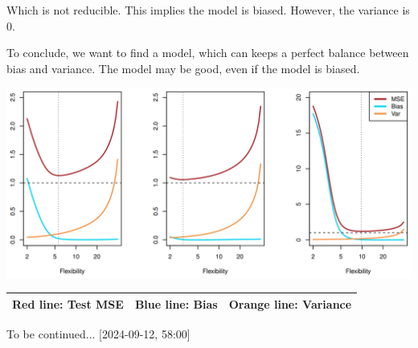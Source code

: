 \documentclass{article}
\theoremstyle{MyNonumberplain}
\theoremstyle{break}
\theoremstyle{break}
\theoremstyle{break}
\theoremstyle{break}
\begin{document}
Which is not reducible. This implies the model is biased. However, the variance is 0. 

To conclude, we want to find a model, which can keeps a perfect balance between bias and variance. The
model may be good, even if the model is biased.

\begin{center}
    \includegraphics*[scale=0.3]{img6.png}
\end{center}

\begin{table}[!h]
    \centering
    \begin{tabular}{|l|l|l|}
    \hline
           Red line: Test MSE     & Blue line: Bias                                       & Orange line: Variance                                        \\ \hline
    \end{tabular}
\end{table}

To be continued... [2024-09-12, 58:00]
\end{document}
